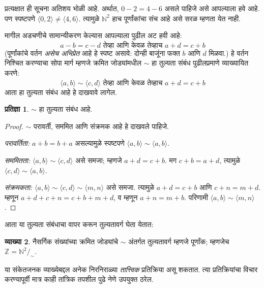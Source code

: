 \documentclass[11pt,a4paper,openany]{book}
\theoremstyle{definition}
\newtheorem{defn}{व्याख्या}[section]
\newtheorem{prop}[defn]{प्रतिज्ञा}
\newcommand{\tuple}[1]{\langle #1\rangle}
\newcommand{\Nat}{\mathbb{N}}
\newcommand{\Int}{\mathbb{Z}}
\newcommand{\equivclass}[2]{#1/_{\!{#2}}}
\newcommand{\Intequiv}{\sim}
\begin{document}
प्रत्यक्षात ही सूचना अतिशय भोळी आहे. अर्थात, $0- 2 = 4 - 6$ असले पाहिजे असे आपल्याला हवे आहे. पण स्पष्टपणे $\tuple{0, 2 }\neq \tuple{4, 6}$. त्यामुळे $\Nat^2$ हाच पूर्णांकांचा संच आहे असे सरळ म्हणता येत नाही.

मागील अडचणीचे सामान्यीकरण केल्यास आपल्याला पुढील अट हवी आहे:
	$$a - b = c - d \text{ तेव्हा आणि केवळ तेव्हाच }a + d = c + b$$
(पूर्णांकांचे वर्तन \emph{असेच अभिप्रेत} आहे हे स्पष्ट असावे: दोन्ही बाजूंना फक्त $b$ आणि $d$ मिळवा.) हे वर्तन निश्चित करण्याचा सोपा मार्ग म्हणजे क्रमित जोड्यांमधील $\Intequiv$ हा तुल्यता संबंध पुढीलप्रमाणे व्याख्यायित करणे:
$$\tuple{ a, b } \Intequiv \tuple{c, d}\text{ तेव्हा आणि केवळ तेव्हाच }a + d = c + b$$
आता हा तुल्यता संबंध आहे हे दाखवावे लागेल.
\begin{prop} $\Intequiv$ हा तुल्यता संबंध आहे.
\end{prop}
	\begin{proof}
	$\Intequiv$ परावर्ती, सममित आणि संक्रमक आहे हे दाखवले पाहिजे.

	\emph{परावर्तिता:} $a + b = b + a$ असल्यामुळे स्पष्टपणे $\tuple{a, b} \Intequiv \tuple{a, b}$.

	\emph{सममितता:} $\tuple{a, b} \Intequiv \tuple{c, d}$ असे समजा; म्हणजे $a + d = c + b$. मग $c + b = a + d$, त्यामुळे $\tuple{c, d} \Intequiv \tuple{a, b}$.

	\emph{संक्रमकता:} $\tuple{a, b} \Intequiv \tuple{c, d}\Intequiv \tuple{m, n}$ असे समजा. त्यामुळे $a + d = c + b$ आणि $c + n = m + d$. म्हणून $a + d + c + n = c + b + m + d$, व म्हणून $a + n = m + b$. परिणामी $\tuple{a, b } \Intequiv \tuple{m, n}$.
\end{proof}

आता या तुल्यता संबंधाचा वापर करून तुल्यतावर्ग घेता येतात:

\begin{defn}
		नैसर्गिक संख्यांच्या क्रमित जोड्यांचे $\Intequiv$ अंतर्गत तुल्यतावर्ग म्हणजे पूर्णांक; म्हणजेच $\Int = \equivclass{\Nat^2}{\Intequiv}$.
\end{defn}

या संकेतजनक व्याख्येबद्दल अनेक निरनिराळ्या \emph{तात्त्विक} प्रतिक्रिया असू शकतात. त्या प्रतिक्रियांचा विचार करण्यापूर्वी मात्र काही तांत्रिक तपशील पुढे नेणे उपयुक्त ठरेल.
\end{document}
